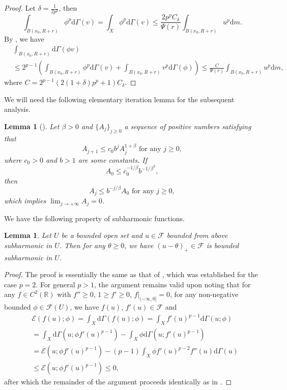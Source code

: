 \documentclass[11pt,a4paper]{article}
\numberwithin{equation}{section}
\theoremstyle{plain}
\newtheorem{lemma}[theorem]{Lemma}
\theoremstyle{definition}
\begin{document}
\begin{proof}
Let $\delta=\frac{1}{2p^p}$, then
$$\int_{B(x_0,R+r)}\phi^p\mathrm{d}\Gamma(v)=\int_X\phi^p\mathrm{d}\Gamma(v)\le \frac{2p^pC_\delta}{\Psi(r)}\int_{B(x_0,R+r)}u^p\mathrm{d} m.$$
By \cite[Lemma 6.1]{Yan25c}, we have
\begin{align*}
&\int_{B(x_0,R+r)}\mathrm{d}\Gamma(\phi v)\\
&\le2^{p-1}\left(\int_{B(x_0,R+r)}\phi^p\mathrm{d}\Gamma(v)+\int_{B(x_0,R+r)}v^p\mathrm{d}\Gamma(\phi)\right)\le\frac{C}{\Psi(r)}\int_{B(x_0,R+r)}u^p\mathrm{d} m,
\end{align*}
where $C=2^{p-1}\left(2(1+\delta)p^p+1\right)C_\delta$.
\end{proof}

We will need the following elementary iteration lemma for the subsequent analysis.

\begin{lemma}[{\cite[LEMMA 4.9]{CKW21}}]\label{lem_iteration}
Let $\beta>0$ and $\{A_j\}_{j\ge0}$ a sequence of positive numbers satisfying that
$$A_{j+1}\le c_0 b^jA_j^{1+\beta}\text{ for any }j\ge0,$$
where $c_0>0$ and $b>1$ are some constants. If
$$A_0\le c_0^{-1/\beta}b^{-1/\beta^2},$$
then
$$A_j\le b^{-j/\beta}A_0\text{ for any }j\ge0,$$
which implies $\lim_{j\to+\infty}A_j=0$.
\end{lemma}

We have the following property of subharmonic functions.

\begin{lemma}\label{lem_subhar}
Let $U$ be a bounded open set and $u\in\mathcal{F}$ bounded from above subharmonic in $U$. Then for any $\theta\ge0$, we have $(u-\theta)_+\in\mathcal{F}$ is bounded subharmonic in $U$.
\end{lemma}

\begin{proof}
The proof is essentially the same as that of \cite[PROPOSITION 2.1]{GHL15}, which was established for the case $p=2$. For general $p>1$, the argument remains valid upon noting that for any $f\in C^2(\mathbb{R})$ with $f''\ge0$, $1\ge f'\ge0$, $f|_{(-\infty,0]}=0$, for any non-negative bounded $\phi\in\mathcal{F}(U)$, we have $f(u)$, $f'(u)\in \mathcal{F}$ and
\begin{align*}
&\mathcal{E}(f(u);\phi)=\int_X\mathrm{d}\Gamma(f(u);\phi)=\int_Xf'(u)^{p-1}\mathrm{d}\Gamma(u;\phi)\\
&=\int_X\mathrm{d}\Gamma(u;\phi f'(u)^{p-1})-\int_X\phi\mathrm{d}\Gamma(u;f'(u)^{p-1})\\
&=\mathcal{E}(u;\phi f'(u)^{p-1})-(p-1)\int_X\phi f'(u)^{p-2}f''(u)\mathrm{d}\Gamma(u)\\
&\le\mathcal{E}(u;\phi f'(u)^{p-1})\le0,
\end{align*}
after which the remainder of the argument proceeds identically as in \cite{GHL15}.
\end{proof}
\end{document}

